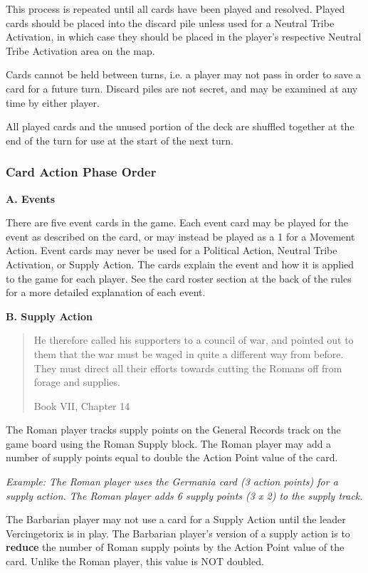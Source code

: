 This process is repeated until all cards have been played and resolved. Played cards should be placed into the discard pile unless used for a Neutral Tribe Activation, in which case they should be placed in the player's respective Neutral Tribe Activation area on the map.

Cards cannot be held between turns, i.e. a player may not pass in order to save a card for a future turn. Discard piles are not secret, and may be examined at any time by either player.

All played cards and the unused portion of the deck are shuffled together at the end of the turn for use at the start of the next turn.

\subsubsection{Card Action Phase Order}

\textbf{A. Events}
\par
There are five event cards in the game. Each event card may be played for the event as described on the card, or may instead be played as a 1 for a Movement Action. Event cards may never be used for a Political Action, Neutral Tribe Activation, or Supply Action. The cards explain the event and how it is applied to the game for each player. See the card roster section at the back of the rules for a more detailed explanation of each event.

\textbf{B. Supply Action}
\blockquote[Book VII, Chapter 14]{He therefore called his supporters to a council of war, and pointed out to them that the war must be waged in quite a different way from before. They must direct all their efforts towards cutting the Romans off from forage and supplies.}
\par
The Roman player tracks supply points on the General Records track on the game board using the Roman Supply block. The Roman player may add a number of supply points equal to double the Action Point value of the card.

\textit{Example: The Roman player uses the Germania card (3 action points) for a supply action. The Roman player adds 6 supply points (3 x 2) to the supply track.}

The Barbarian player may not use a card for a Supply Action until the leader Vercingetorix is in play. The Barbarian player's version of a supply action is to \textbf{reduce} the number of Roman supply points by the Action Point value of the card. Unlike the Roman player, this value is NOT doubled.


